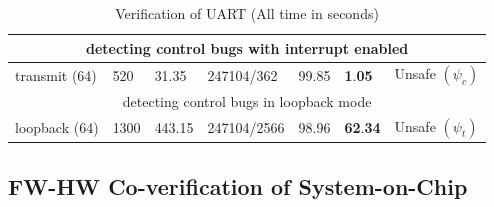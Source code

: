 \documentclass[sigconf]{acmart}
\begin{document}
\begin{table}
\begin{center}
{\begin{scriptsize}
\begin{tabular}{|l|l|l|l|l|l|l|}
\multicolumn{7}{|c|}{detecting control bugs with interrupt enabled} \\ \hline
transmit (64) & 520 & 31.35 & 247104/362 & 99.85 &
  \textbf{1}.\textbf{05} & Unsafe $(\psi_{c})$ \\ \hline
\multicolumn{7}{|c|}{detecting control bugs in loopback mode} \\ \hline
  loopback (64) & 1300 & 443.15 & 247104/2566 & 98.96 & \textbf{62}.\textbf{34}
  & Unsafe $(\psi_{t})$ \\ \hline
\end{tabular}
\end{scriptsize}
}
\end{center}
  \caption{Verification of UART (All time in seconds)
\label{table:safe}}
\end{table}

\subsection{FW-HW Co-verification of System-on-Chip}
\end{document}
